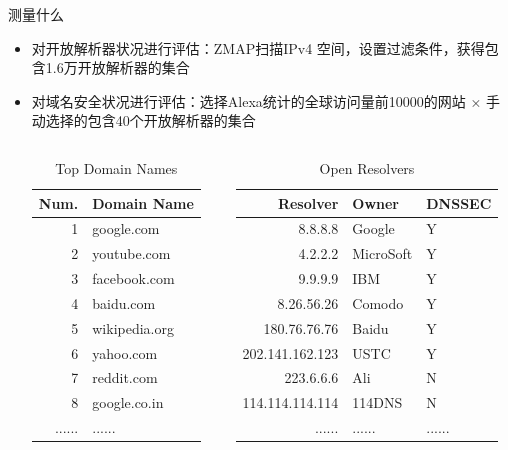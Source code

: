 \documentclass{beamer}
\begin{document}
\begin{frame}{测量什么}
  \begin{itemize}
    \item 对开放解析器状况进行评估：ZMAP扫描IPv4 空间，设置过滤条件，获得包含1.6万开放解析器的集合
    \item 对域名安全状况进行评估：选择Alexa统计的全球访问量前10000的网站 × 手动选择的包含40个开放解析器的集合
    \begin{columns}
      
      \begin{column}{0.5\textwidth}
        
        \begin{table}
          \tiny
        \begin{tabular}{r|l}
          \toprule
          Num. & Domain Name\\
          \midrule
          1&google.com\\
          2&youtube.com\\
          3&facebook.com\\
          4&baidu.com\\
          5&wikipedia.org\\
          6&yahoo.com\\
          7&reddit.com\\
          8&google.co.in\\
          ......&...... \\
          \bottomrule
          \end{tabular}
          \caption{\scriptsize{Top Domain Names}}
        \end{table}
      \end{column}
      \begin{column}{0.5\textwidth}
        \begin{table}
          \tiny
        \begin{tabular}{r|l|l}
          \toprule
          Resolver& Owner&DNSSEC\\
          \midrule
          8.8.8.8 & Google&Y \\
          4.2.2.2&     MicroSoft&Y \\
          9.9.9.9&  IBM&Y \\
          8.26.56.26& Comodo&Y \\
          180.76.76.76&Baidu&Y\\
          202.141.162.123&USTC&Y\\
          223.6.6.6&Ali&N \\
          114.114.114.114 & 114DNS&N \\
          ......&...... &......\\
          \bottomrule
          \end{tabular}
          \caption{\scriptsize{Open Resolvers}}
        \end{table}
      \end{column}
      \end{columns}
  \end{itemize}

\end{frame}
\end{document}
